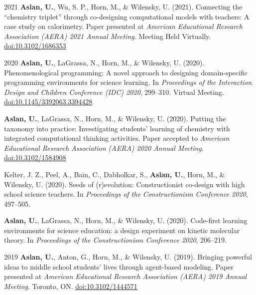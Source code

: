 \documentclass[11pt,letterpaper]{report} %
\begin{document}
    \begin{tablist}

        \item[2021] \tab{}\textbf{Aslan, U.}, Wu, S. P., Horn, M., \& Wilensky, U. (2021). Connecting the \enquote{chemistry triplet} through co-designing computational models with teachers: A case study on calorimetry. Paper presented at \textit{American Educational Research Association (AERA) 2021 Annual Meeting}. Meeting Held Virtually. \href{https://doi.org/10.3102/1686353}{doi:10.3102/1686353}

        \item[2020] \tab{}\textbf{Aslan, U.}, LaGrassa, N., Horn, M., \& Wilensky, U. (2020). Phenomenological programming: A novel approach to designing domain-specific programming environments for science learning. In \textit{Proceedings of the Interaction Design and Children Conference (IDC) 2020}, 299--310. Virtual Meeting. \href{https://doi.org/10.1145/3392063.3394428}{doi:10.1145/3392063.3394428}

        \item[] \tab{}\textbf{Aslan, U.}, LaGrassa, N., Horn, M., \& Wilensky, U. (2020). Putting the taxonomy into practice: Investigating students’ learning of chemistry with integrated computational thinking activities. Paper accepted to \textit{American Educational Research Association (AERA) 2020 Annual Meeting}. \href{https://doi.org/10.3102/1584908}{doi:10.3102/1584908}

        \item[] \tab{}Kelter, J. Z., Peel, A., Bain, C., Dabholkar, S., \textbf{Aslan, U.}, Horn, M., \& Wilensky, U. (2020). Seeds of (r)evolution: Constructionist co-design with high school science teachers. In \textit{Proceedings of the Constructionism Conference 2020}, 497--505.

        \item[] \tab{}\textbf{Aslan, U.}, LaGrassa, N., Horn, M., \& Wilensky, U. (2020). Code-first learning environments for science education: a design experiment on kinetic molecular theory. In \textit{Proceedings of the Constructionism Conference 2020}, 206--219.

        \item[2019] \tab{}\textbf{Aslan, U.}, Anton, G., Horn, M., \& Wilensky, U. (2019). Bringing powerful ideas to middle school students' lives through agent-based modeling. Paper presented at \textit{American Educational Research Association (AERA) 2019 Annual Meeting}. Toronto, ON. \href{https://doi.org/10.3102/1444571}{doi:10.3102/1444571}


\end{tablist}
\end{document}
